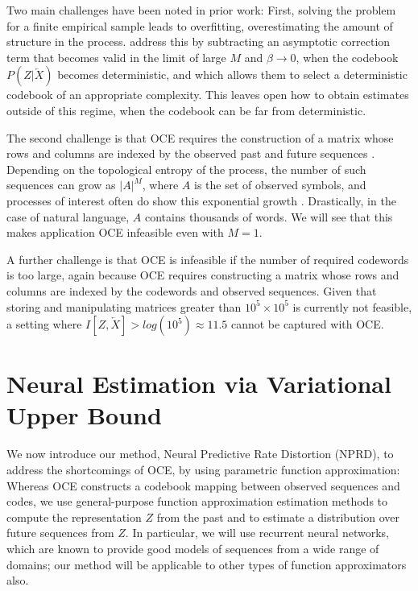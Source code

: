 \documentclass[11pt,letterpaper]{article}
\begin{document}
Two main challenges have been noted in prior work:
First, solving the problem for a finite empirical sample leads to overfitting, overestimating the amount of structure in the process.
\citet{still-optimal-2010} address this by subtracting an asymptotic correction term that becomes valid in the limit of large $M$ and $\beta \rightarrow 0$, when the codebook $P(Z|\overleftarrow{X})$ becomes deterministic, and which allows them to select a deterministic codebook of an appropriate complexity.
This leaves open how to obtain estimates outside of this regime, when the codebook can be far from deterministic.

The second challenge is that OCE requires the construction of a matrix whose rows and columns are indexed by the observed past and future sequences \citep{marzen-predictive-2016}.
Depending on the topological entropy of the process, the number of such sequences can grow as $|A|^M$, where $A$ is the set of observed symbols, and processes of interest often do show this exponential growth \citep{marzen-predictive-2016}.
Drastically, in the case of natural language, $A$ contains thousands of words.
We will see that this makes application OCE infeasible even with $M=1$.

A further challenge is that OCE is infeasible if the number of required codewords is too large, again because OCE requires constructing a matrix whose rows and columns are indexed by the codewords and observed sequences.
Given that storing and manipulating matrices greater than $10^5 \times 10^5$ is currently not feasible, a setting where $I[Z, \overleftarrow{X}] > log(10^5) \approx 11.5$ cannot be captured with OCE.

\section{Neural Estimation via Variational Upper Bound}

We now introduce our method, Neural Predictive Rate Distortion (NPRD), to address the shortcomings of OCE, by using parametric function approximation:
Whereas OCE constructs a codebook mapping between observed sequences and codes, we use general-purpose function approximation estimation methods to compute the representation $Z$ from the past and to estimate a distribution over future sequences from $Z$.
In particular, we will use recurrent neural networks, which are known to provide good models of sequences from a wide range of domains; our method will be applicable to other types of function approximators also.
\end{document}

